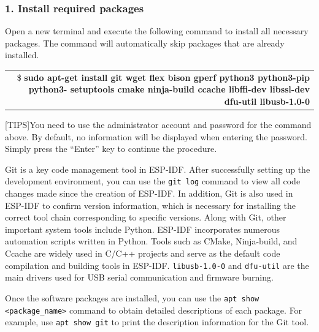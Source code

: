 \documentclass[a4paper,12pt,openany]{book}
\renewcommand{\ttfamily}{\fontfamily{pcr}\selectfont}
\renewcommand{\arraystretch}{1}
\newenvironment{codebloc}{ %
    \ttfamily\footnotesize
    \renewcommand{\arraystretch}{1}
}
\newcommand{\note}[2][NOTE]{ %
\vspace{6pt}
\begin{tabular}{b{\textwidth}}
\hline
\fontfamily{phv}\selectfont \textbf{#1}\\
\leftskip 1em #2\\
\hline
\end{tabular}
}
\begin{document}
\subsubsection{1. Install required packages}
Open a new terminal and execute the following command to install all necessary packages. The command will automatically skip packages that are already installed.

\begin{codebloc}
\begin{tabular}{d}
\$ \textbf{sudo apt-get install git wget flex bison gperf python3 python3-pip python3- setuptools cmake ninja-build ccache libffi-dev libssl-dev dfu-util libusb-1.0-0}
\end{tabular}
\end{codebloc}

\note[TIPS]{You need to use the administrator account and password for the command above. By default, no information will be displayed when entering the password. Simply press the “Enter” key to continue the procedure.}

Git is a key code management tool in ESP-IDF. After successfully setting up the development environment, you can use the \verb|git log| command to view all code changes made since the creation of ESP-IDF. In addition, Git is also used in ESP-IDF to confirm version information, which is necessary for installing the correct tool chain corresponding to specific versions. Along with Git, other important system tools include Python. ESP-IDF incorporates numerous automation scripts written in Python. Tools such as CMake, Ninja-build, and Ccache are widely used in C/C++ projects and serve as the default code compilation and building tools in ESP-IDF. \verb|libusb-1.0-0| and \verb|dfu-util| are the main drivers used for USB serial communication and firmware burning.

Once the software packages are installed, you can use the \verb|apt show <package_name>| command to obtain detailed descriptions of each package. For example, use \verb|apt show git| to print the description information for the Git tool.

\end{document}
